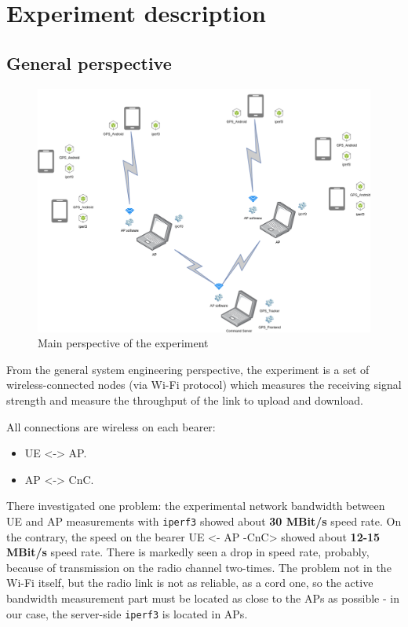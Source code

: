 \hypertarget{experiment-description}{%
\section{Experiment description}\label{experiment-description}}

\hypertarget{general-perspective}{%
\subsection{General perspective}\label{general-perspective}}

\begin{figure}[H]
\centering
\includegraphics[width=\linewidth,keepaspectratio]{images/Deployment Diagram-Free-structure_scheme.png}
\caption{Main perspective of the experiment}
\label{fig:experiment-overall-layout}
\end{figure}

From the general system engineering perspective, the experiment is a set
of wireless-connected nodes (via Wi-Fi protocol) which measures the
receiving signal strength and measure the throughput of the link to
upload and download.

All connections are wireless on each bearer:

\begin{itemize}
\tightlist
\item
  UE \textless{}-\textgreater{} AP.
\item
  AP \textless{}-\textgreater{} CnC.
\end{itemize}

There investigated one problem: the experimental network bandwidth
between UE and AP measurements with \texttt{iperf3} showed about
\textbf{30 MBit/s} speed rate. On the contrary, the speed on the bearer
UE \textless{}- AP -CnC\textgreater{} showed about \textbf{12-15 MBit/s}
speed rate. There is markedly seen a drop in speed rate, probably,
because of transmission on the radio channel two-times. The problem not
in the Wi-Fi itself, but the radio link is not as reliable, as a cord
one, so the active bandwidth measurement part must be located as close
to the APs as possible - in our case, the server-side \texttt{iperf3} is
located in APs.

